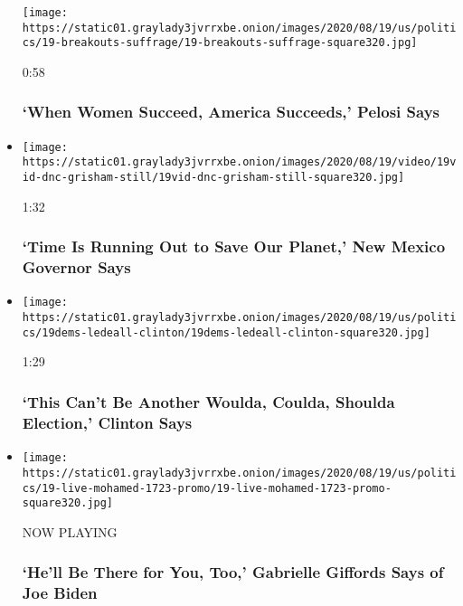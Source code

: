 \begin{itemize}
  \texttt{[image: https://static01.graylady3jvrrxbe.onion/images/2020/08/19/us/politics/19-breakouts-suffrage/19-breakouts-suffrage-square320.jpg]}

  0:58

  \hypertarget{when-women-succeed-america-succeeds-pelosi-says}{%
  \subsubsection{`When Women Succeed, America Succeeds,' Pelosi
  Says}\label{when-women-succeed-america-succeeds-pelosi-says}}
\item
  \href{https://www.nytimes3xbfgragh.onion/video/us/elections/100000007297726/michelle-lujan-grisham-speaks-dnc.html?action=click\&module=video-series-bar\&region=header\&pgtype=Article\&playlistId=video/latest-video}{}

  \texttt{[image: https://static01.graylady3jvrrxbe.onion/images/2020/08/19/video/19vid-dnc-grisham-still/19vid-dnc-grisham-still-square320.jpg]}

  1:32

  \hypertarget{time-is-running-out-to-save-our-planet-new-mexico-governor-says}{%
  \subsubsection{`Time Is Running Out to Save Our Planet,' New Mexico
  Governor
  Says}\label{time-is-running-out-to-save-our-planet-new-mexico-governor-says}}
\item
  \href{https://www.nytimes3xbfgragh.onion/video/us/elections/100000007297618/hillary-clinton-speaks-dnc.html?action=click\&module=video-series-bar\&region=header\&pgtype=Article\&playlistId=video/latest-video}{}

  \texttt{[image: https://static01.graylady3jvrrxbe.onion/images/2020/08/19/us/politics/19dems-ledeall-clinton/19dems-ledeall-clinton-square320.jpg]}

  1:29

  \hypertarget{this-cant-be-another-woulda-coulda-shoulda-election-clinton-says}{%
  \subsubsection{`This Can't Be Another Woulda, Coulda, Shoulda
  Election,' Clinton
  Says}\label{this-cant-be-another-woulda-coulda-shoulda-election-clinton-says}}
\item
  \texttt{[image: https://static01.graylady3jvrrxbe.onion/images/2020/08/19/us/politics/19-live-mohamed-1723-promo/19-live-mohamed-1723-promo-square320.jpg]}

  NOW PLAYING

  \hypertarget{hell-be-there-for-you-too-gabrielle-giffords-says-of-joe-biden-2}{%
  \subsubsection{`He'll Be There for You, Too,' Gabrielle Giffords Says
  of Joe
  Biden}\label{hell-be-there-for-you-too-gabrielle-giffords-says-of-joe-biden-2}}
\end{itemize}

